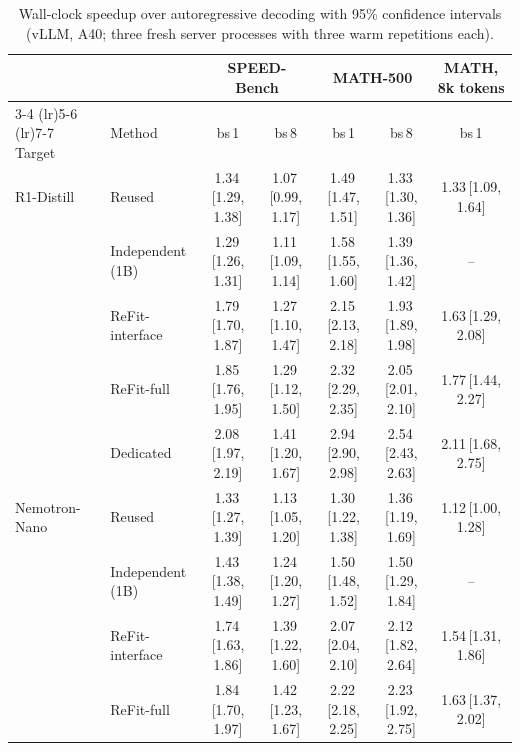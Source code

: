 \documentclass[11pt]{article}
\newcommand{\refitI}{ReFit-interface}
\newcommand{\refitF}{ReFit-full}
\begin{document}
\begin{table}[t]
  \centering
  \small
  \setlength{\tabcolsep}{4pt}
  \begin{tabular}{@{}llccccc@{}}
    \toprule
    & & \multicolumn{2}{c}{SPEED-Bench} & \multicolumn{2}{c}{MATH-500} & MATH, 8k tokens \\
    \cmidrule(lr){3-4} \cmidrule(lr){5-6} \cmidrule(lr){7-7}
    Target & Method & bs\,1 & bs\,8 & bs\,1 & bs\,8 & bs\,1 \\
    \midrule
    R1-Distill & Reused & 1.34\,{\scriptsize[1.29, 1.38]} & 1.07\,{\scriptsize[0.99, 1.17]} & 1.49\,{\scriptsize[1.47, 1.51]} & 1.33\,{\scriptsize[1.30, 1.36]} & 1.33\,{\scriptsize[1.09, 1.64]} \\
     & Independent (1B) & 1.29\,{\scriptsize[1.26, 1.31]} & 1.11\,{\scriptsize[1.09, 1.14]} & 1.58\,{\scriptsize[1.55, 1.60]} & 1.39\,{\scriptsize[1.36, 1.42]} & -- \\
     & \refitI{} & 1.79\,{\scriptsize[1.70, 1.87]} & 1.27\,{\scriptsize[1.10, 1.47]} & 2.15\,{\scriptsize[2.13, 2.18]} & 1.93\,{\scriptsize[1.89, 1.98]} & 1.63\,{\scriptsize[1.29, 2.08]} \\
     & \refitF{} & 1.85\,{\scriptsize[1.76, 1.95]} & 1.29\,{\scriptsize[1.12, 1.50]} & 2.32\,{\scriptsize[2.29, 2.35]} & 2.05\,{\scriptsize[2.01, 2.10]} & 1.77\,{\scriptsize[1.44, 2.27]} \\
     & Dedicated & 2.08\,{\scriptsize[1.97, 2.19]} & 1.41\,{\scriptsize[1.20, 1.67]} & 2.94\,{\scriptsize[2.90, 2.98]} & 2.54\,{\scriptsize[2.43, 2.63]} & 2.11\,{\scriptsize[1.68, 2.75]} \\
    \midrule
    Nemotron-Nano & Reused & 1.33\,{\scriptsize[1.27, 1.39]} & 1.13\,{\scriptsize[1.05, 1.20]} & 1.30\,{\scriptsize[1.22, 1.38]} & 1.36\,{\scriptsize[1.19, 1.69]} & 1.12\,{\scriptsize[1.00, 1.28]} \\
     & Independent (1B) & 1.43\,{\scriptsize[1.38, 1.49]} & 1.24\,{\scriptsize[1.20, 1.27]} & 1.50\,{\scriptsize[1.48, 1.52]} & 1.50\,{\scriptsize[1.29, 1.84]} & -- \\
     & \refitI{} & 1.74\,{\scriptsize[1.63, 1.86]} & 1.39\,{\scriptsize[1.22, 1.60]} & 2.07\,{\scriptsize[2.04, 2.10]} & 2.12\,{\scriptsize[1.82, 2.64]} & 1.54\,{\scriptsize[1.31, 1.86]} \\
     & \refitF{} & 1.84\,{\scriptsize[1.70, 1.97]} & 1.42\,{\scriptsize[1.23, 1.67]} & 2.22\,{\scriptsize[2.18, 2.25]} & 2.23\,{\scriptsize[1.92, 2.75]} & 1.63\,{\scriptsize[1.37, 2.02]} \\
    \bottomrule
  \end{tabular}
    \caption{Wall-clock speedup over autoregressive decoding with 95\% confidence intervals (vLLM, A40; three fresh server processes with three warm repetitions each).}
  \label{tab:timing}
\end{table}
\end{document}
